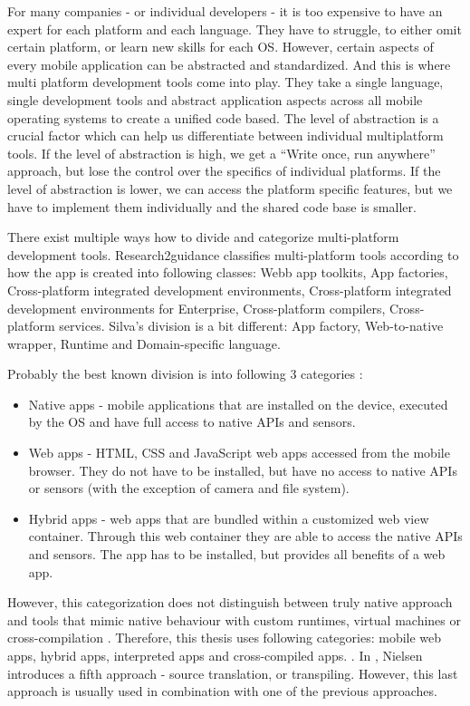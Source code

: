 \documentclass[english,master,public,dept460,male,cpdeclaration,oneside]{diploma}
\begin{document}
For many companies - or individual developers - it is too expensive to have an expert for each platform and each language. They have to struggle, to either omit certain platform, or learn new skills for each OS. However, certain aspects of every mobile application can be abstracted and standardized. And this is where multi platform development tools come into play. They take a single language, single development tools and abstract application aspects across all mobile operating systems to create a unified code based. The level of abstraction is a crucial factor which can help us differentiate between individual multiplatform tools. If the level of abstraction is high, we get a “Write once, run anywhere” approach, but lose the control over the specifics of individual platforms. If the level of abstraction is lower, we can access the platform specific features, but we have to implement them individually and the shared code base is smaller.

There exist multiple ways how to divide and categorize multi-platform development tools. Research2guidance \cite{cptBenchmarking2014} classifies multi-platform tools according to how the app is created into following classes: Webb app toolkits, App factories, Cross-platform integrated development environments, Cross-platform integrated development environments for Enterprise, Cross-platform compilers, Cross-platform services. Silva’s division \cite{ribeiroDaSilva} is a bit different: App factory, Web-to-native wrapper, Runtime and Domain-specific language.

Probably the best known division is into following 3 categories \cite{aComparativeStudy} \cite{smutny} \cite{taxonomyCP}:
\begin{itemize}
	\item Native apps - mobile applications that are installed on the device, executed by the OS and have full access to native APIs and sensors.
	\item Web apps - HTML, CSS and JavaScript web apps accessed from the mobile browser. They do not have to be installed, but have no access to native APIs or sensors (with the exception of camera and file system).
	\item Hybrid apps - web apps that are bundled within a customized web view container. Through this web container they are able to access the native APIs and sensors. The app has to be installed, but provides all benefits of a web app.
\end{itemize}

However, this categorization does not distinguish between truly native approach and tools that mimic native behaviour with custom runtimes, virtual machines or cross-compilation \cite{definingTelerik}. Therefore, this thesis uses following categories: mobile web apps, hybrid apps, interpreted apps and cross-compiled apps. \cite{uppsala}\cite{rajTolety}\cite{evaluationOfCP}. In \cite{aarhus}, Nielsen introduces a fifth approach - source translation, or transpiling. However, this last approach is usually used in combination with one of the previous approaches.
\end{document}
